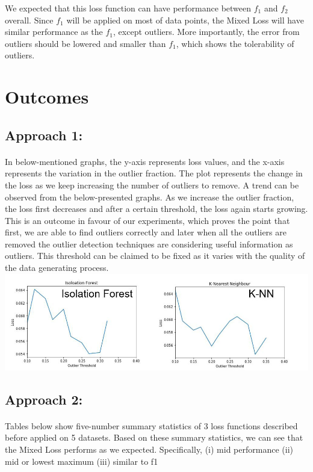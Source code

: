 \documentclass[runningheads]{llncs}
\begin{document}
We expected that this loss function can have performance between $f_1$ and $f_2$ overall. Since $f_1$ will be applied on most of data points, the Mixed Loss will have similar performance as the $f_1$, except outliers. More importantly, the error from outliers should be lowered and smaller than $f_1$, which shows the tolerability of outliers.


\section{Outcomes}
\subsection{Approach 1:}
\paragraph{} In below-mentioned graphs, the y-axis represents loss values, and the x-axis represents the variation in the outlier fraction. The plot represents the change in the loss as we keep increasing the number of outliers to remove. A trend can be observed from the below-presented graphs.  As we increase the outlier fraction, the loss first decreases and after a certain threshold, the loss again starts growing. This is an outcome in favour of our experiments, which proves the point that first, we are able to find outliers correctly and later when all the outliers are removed the outlier detection techniques are considering useful information as outliers. This threshold can be claimed to be fixed as it varies with the quality of the data generating process. \\
\includegraphics[scale=0.37]{tt2.jpg}

\subsection{Approach 2:}
\paragraph{}Tables below show five-number summary statistics of 3 loss functions described before applied on 5 datasets. Based on these summary statistics, we can see that the Mixed Loss performs as we expected. Specifically, (i) mid performance (ii) mid or lowest maximum (iii) similar to f1
\end{document}
